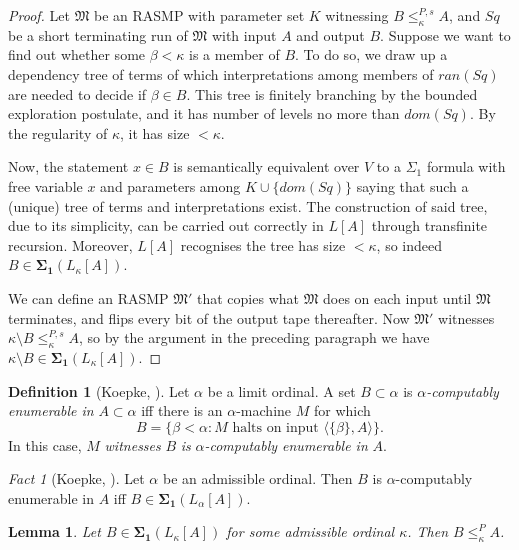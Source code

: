 \documentclass[12pt, twoside]{memoir}
\numberwithin{equation}{section}
\newtheorem{lem}[thm]{Lemma}
\theoremstyle{definition}
\newtheorem{defi}[thm]{Definition}
\theoremstyle{remark}
\newtheorem{fact}[thm]{Fact}
\theoremstyle{definition}
\theoremstyle{definition}
\theoremstyle{definition}
\theoremstyle{remark}
\begin{document}
\begin{proof}
Let $\mathfrak{M}$ be an RASMP with parameter set $K$ witnessing $B \leq^{P, s}_{\kappa} A$, and $Sq$ be a short terminating run of $\mathfrak{M}$ with input $A$ and output $B$. Suppose we want to find out whether some $\beta < \kappa$ is a member of $B$. To do so, we draw up a dependency tree of terms of which interpretations among members of $ran(Sq)$ are needed to decide if $\beta \in B$. This tree is finitely branching by the bounded exploration postulate, and it has number of levels no more than $dom(Sq)$. By the regularity of $\kappa$, it has size $< \kappa$. 

Now, the statement $x \in B$ is semantically equivalent over $V$ to a $\Sigma_1$ formula with free variable $x$ and parameters among $K \cup \{dom(Sq)\}$ saying that such a (unique) tree of terms and interpretations exist. The construction of said tree, due to its simplicity, can be carried out correctly in $L[A]$ through transfinite recursion. Moreover, $L[A]$ recognises the tree has size $< \kappa$, so indeed $B \in \mathbf{\Sigma_1}(L_{\kappa}[A])$.

We can define an RASMP $\mathfrak{M}'$ that copies what $\mathfrak{M}$ does on each input until $\mathfrak{M}$ terminates, and flips every bit of the output tape thereafter. Now $\mathfrak{M}'$ witnesses $\kappa \setminus B \leq^{P, s}_{\kappa} A$, so by the argument in the preceding paragraph we have $\kappa \setminus B \in \mathbf{\Sigma_1}(L_{\kappa}[A])$.
\end{proof}

\begin{defi}[Koepke, \cite{koepke2}]
Let $\alpha$ be a limit ordinal. A set $B \subset \alpha$ is $\alpha$\emph{-computably enumerable in} $A \subset \alpha$ iff there is an $\alpha$-machine $M$ for which
\begin{equation*}
    B = \{\beta < \alpha : M \text{ halts on input } \langle \{\beta\}, A \rangle\} \text{.}
\end{equation*}
In this case, $M$ \emph{witnesses} $B$ \emph{is} $\alpha$\emph{-computably enumerable in} $A$.
\end{defi}

\begin{fact}[Koepke, \cite{koepke2}]\label{fact272}
Let $\alpha$ be an admissible ordinal. Then $B$ is $\alpha$-computably enumerable in $A$ iff $B \in \mathbf{\Sigma_1}(L_{\alpha}[A])$.
\end{fact}

\begin{lem}\label{lem273}
Let $B \in \mathbf{\Sigma_1}(L_{\kappa}[A])$ for some admissible ordinal $\kappa$. Then $B \leq^P_{\kappa} A$.
\end{lem}
\end{document}
